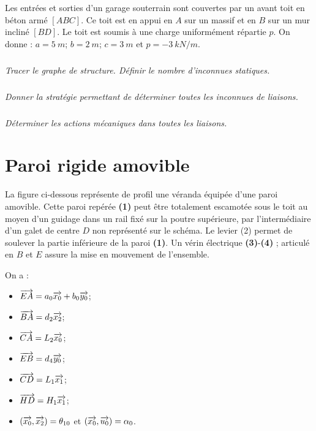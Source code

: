 \documentclass[10pt,fleqn]{article} %
\begin{document}
\begin{multicols}{2}
Les entrées et sorties d’un garage souterrain sont couvertes par un avant toit en béton armé $[ABC]$. Ce toit est en appui en $A$ sur un massif et en $B$ sur un mur incliné $[BD]$. Le toit est soumis à une charge uniformément répartie $p$. On donne :
$a=\SI{5}{m}$; $b=\SI{2}{m}$; $c=\SI{3}{m}$ et $p=\SI{-3}{kN/m}$.


\subparagraph{}\textit{Tracer le graphe de structure. Définir le nombre d'inconnues statiques.}

\subparagraph{}\textit{Donner la stratégie permettant de déterminer toutes les inconnues de liaisons.}

\subparagraph{}\textit{Déterminer les actions mécaniques dans toutes les liaisons.}



\section*{Paroi rigide amovible}
\setcounter{exo}{0}

La figure ci-dessous représente de profil une véranda équipée d'une paroi amovible. Cette paroi repérée \textbf{(1)} peut être totalement escamotée sous le toit au moyen d'un guidage dans un rail fixé sur la poutre supérieure, par l'intermédiaire d'un galet de centre $D$ non représenté sur le schéma. Le levier (2) permet de soulever la partie inférieure de la paroi \textbf{(1)}. Un vérin électrique \textbf{(3)}-\textbf{(4)} ; articulé en $B$ et $E$ assure la mise en mouvement de l'ensemble.

On a : 
\begin{multicols}{2}
\begin{itemize}
\item $\overrightarrow{EA}=a_0\overrightarrow{x_0} + b_0\overrightarrow{y_0}$;
\item $\overrightarrow{BA}=d_2\overrightarrow{x_2}$;
\item $\overrightarrow{CA}=L_2\overrightarrow{x_0}$;
\item $\overrightarrow{EB}=d_4\overrightarrow{y_0}$;
\item $\overrightarrow{CD}=L_1\overrightarrow{x_1}$;
\item $\overrightarrow{HD}=H_1\overrightarrow{x_1}$;
\item $\left(\overrightarrow{x_0},\overrightarrow{x_2}\right)=\theta_{10}$ et $\left(\overrightarrow{x_0},\overrightarrow{u_0}\right)=\alpha_{0}$.
\end{itemize}
\end{multicols}


\end{multicols}
\end{document}
